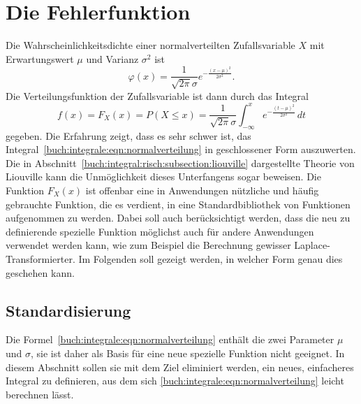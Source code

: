 %
%
%
\section{Die Fehlerfunktion
\label{buch:integrale:section:fehlerfunktion}}
Die Wahrscheinlichkeitsdichte einer normalverteilten Zufallsvariable $X$
mit Erwartungswert $\mu$ und Varianz $\sigma^2$ ist
\begin{equation}
\varphi(x)
=
\frac{1}{\sqrt{2\pi}\sigma}
e^{-\frac{(x-\mu)^2}{2\sigma^2}}.
\label{buch:integrale:eqn:normaldichte}
\end{equation}
Die Verteilungsfunktion der Zufallsvariable ist dann durch das Integral
\begin{equation}
f(x)
=
F_X(x)
=
P(X\le x)
=
\frac{1}{\sqrt{2\pi}\sigma}
\int_{-\infty}^x 
e^{-\frac{(t-\mu)^2}{2\sigma^2}}
\,dt
\label{buch:integrale:eqn:normalverteilung}
\end{equation}
gegeben.
Die Erfahrung zeigt, dass es sehr schwer ist, das
Integral~\eqref{buch:integrale:eqn:normalverteilung}
in geschlossener Form auszuwerten.
Die in Abschnitt~\ref{buch:integral:risch:subsection:liouville}
dargestellte Theorie von Liouville kann die Unmöglichkeit dieses
Unterfangens sogar beweisen.
Die Funktion $F_X(x)$ ist offenbar eine in Anwendungen nützliche und
häufig gebrauchte Funktion, die es verdient, in eine Standardbibliothek
von Funktionen aufgenommen zu werden.
Dabei soll auch berücksichtigt werden, dass die neu zu definierende
spezielle Funktion möglichst auch für andere Anwendungen verwendet
werden kann, wie zum Beispiel die Berechnung gewisser Laplace-Transformierter.
Im Folgenden soll gezeigt werden, in welcher Form genau dies geschehen
kann.

%
%
\subsection{Standardisierung}
Die Formel~\eqref{buch:integrale:eqn:normalverteilung} enthält die zwei 
Parameter $\mu$ und $\sigma$, sie ist daher als Basis für eine neue
spezielle Funktion nicht geeignet.
In diesem Abschnitt sollen sie mit dem Ziel eliminiert werden, ein
neues, einfacheres Integral zu definieren, aus dem sich 
\eqref{buch:integrale:eqn:normalverteilung} leicht berechnen lässt.

%
%
